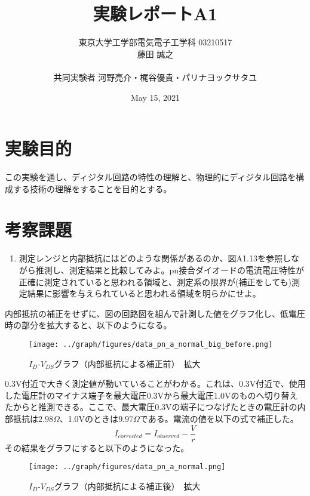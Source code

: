 \documentclass[a4j,dvipdfmx,titlepage]{article}
\title{実験レポートA1}
\author{東京大学工学部電気電子工学科 03210517\\藤田 誠之\\~\\ 共同実験者  河野亮介・梶谷優貴・パリナヨックサタユ}
\date{May 15, 2021}
\begin{document}

\maketitle
\newpage

\section{実験目的}
この実験を通し、ディジタル回路の特性の理解と、物理的にディジタル回路を構成する技術の理解をすることを目的とする。

\section{考察課題}

\begin{enumerate}[label={(\arabic*)}]
  \item 測定レンジと内部抵抗にはどのような関係があるのか、図A1.13を参照しながら推測し、測定結果と比較してみよ。pn接合ダイオードの電流電圧特性が正確に測定されていると思われる領域と、測定系の限界が(補正をしても)測定結果に影響を与えられていると思われる領域を明らかにせよ。
\end{enumerate}
内部抵抗の補正をせずに、図の回路図を組んで計測した値をグラフ化し、低電圧時の部分を拡大すると、以下のようになる。
\begin{figure}[H]
  \begin{center}
  \texttt{[image: ../graph/figures/data\_pn\_a\_normal\_big\_before.png]}
  \caption{$I_D$-$V_{DS}$グラフ（内部抵抗による補正前）　拡大}
  \end{center}
\end{figure}

0.3V付近で大きく測定値が動いていることがわかる。これは、0.3V付近で、使用した電圧計のマイナス端子を最大電圧0.3Vから最大電圧1.0Vのものへ切り替えたからと推測できる。ここで、最大電圧0.3Vの端子につなげたときの電圧計の内部抵抗は$2.98\Omega$、1.0Vのときは$9.97\Omega$である。電流の値を以下の式で補正した。
$$
I_{corrected} = I_{observed} - \frac{V}{r}
$$
その結果をグラフにすると以下のようになった。

\begin{figure}[H]
  \begin{center}
  \texttt{[image: ../graph/figures/data\_pn\_a\_normal.png]}
  \caption{$I_D$-$V_{DS}$グラフ（内部抵抗による補正後）　拡大}
  \end{center}
\end{figure}
\end{document}
